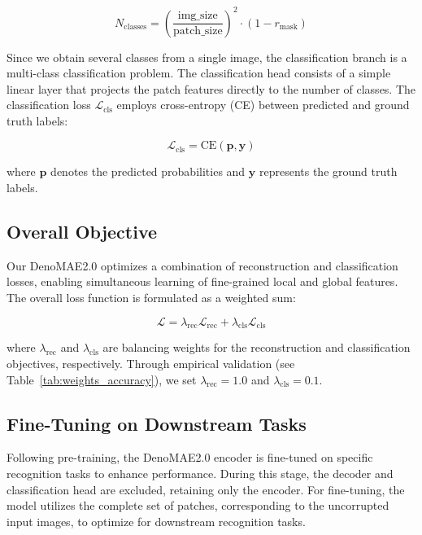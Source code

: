 \begin{equation}
    N_{\text{classes}} = \left(\frac{\text{img\_size}}{\text{patch\_size}}\right)^2 \cdot (1 - r_{\text{mask}})
\end{equation}

Since we obtain several classes from a single image, the classification branch is a multi-class classification problem. The classification head consists of a simple linear layer that projects the patch features directly to the number of classes. The classification loss $\mathcal{L}_{\text{cls}}$ employs cross-entropy (CE) between predicted and ground truth labels:

\begin{equation}
    \mathcal{L}_{\text{cls}} = \text{CE}(\mathbf{p}, \mathbf{y})
\end{equation}

where $\mathbf{p}$ denotes the predicted probabilities and $\mathbf{y}$ represents the ground truth labels.

\subsection{Overall Objective}

Our DenoMAE2.0 optimizes a combination of reconstruction and classification losses, enabling simultaneous learning of fine-grained local and global features. The overall loss function is formulated as a weighted sum:

\begin{equation}
    \mathcal{L} = \lambda_{\text{rec}}\mathcal{L}_{\text{rec}} + \lambda_{\text{cls}}\mathcal{L}_{\text{cls}}
\end{equation}

where $\lambda_{\text{rec}}$ and $\lambda_{\text{cls}}$ are balancing weights for the reconstruction and classification objectives, respectively. Through empirical validation (see Table~\ref{tab:weights_accuracy}), we set $\lambda_{\text{rec}} = 1.0$ and $\lambda_{\text{cls}} = 0.1$.

\subsection{Fine-Tuning on Downstream Tasks}

Following pre-training, the DenoMAE2.0 encoder is fine-tuned on specific recognition tasks to enhance performance. During this stage, the decoder and classification head are excluded, retaining only the encoder. For fine-tuning, the model utilizes the complete set of patches, corresponding to the uncorrupted input images, to optimize for downstream recognition tasks.
